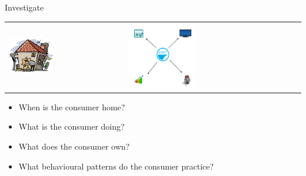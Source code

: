 \begin{frame}{Investigate}

\begin{tabular}{l l}

  \includegraphics[width=0.4\textwidth]{graphics/hus.jpg}
&
\includegraphics[width=0.4\textwidth]{graphics/smartmeterdata.png}
\end{tabular}

     \begin{itemize}
        \item When is the consumer home?
        \item What is the consumer doing?
        \item What does the consumer own?
        \item What behavioural patterns do the consumer practice?
      \end{itemize}
\end{frame}

